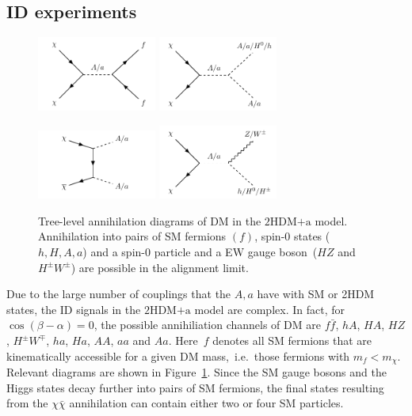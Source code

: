 \documentclass[a4paper, 11pt,notoc]{article}
\newcommand{\hdma}{\ensuremath{\textrm{2HDM+a}}\xspace}
\begin{document}
\subsection{ID experiments}

\begin{figure}[t!]
\centering
\includegraphics[width=0.35\textwidth]{graph_2hdm_relic_s_fermions.pdf} \qquad 
\includegraphics[width=0.35\textwidth]{graph_2hdm_relic_s_bosons.pdf} 

\vspace{5mm}

\includegraphics[width=0.35\textwidth]{graph_2hdm_relic_ss_bosons.pdf} \qquad 
\includegraphics[width=0.35\textwidth]{graph_2hdm_relic_s_vbosons.pdf}
\vspace{4mm}
\caption{Tree-level annihilation diagrams of DM in the \hdma model. Annihilation into pairs of SM fermions $(f)$, spin-0 states ($h, H,A,a$) and a spin-0 particle and a EW gauge boson~($HZ$ and $H^\pm W^\pm$) are possible in the alignment limit.}
\label{fig:feyn_annihilation}
\end{figure}

Due to the large number of couplings that the $A, a$ have with SM or 2HDM states, the ID signals in the \hdma model are  complex. In fact, for~$\cos (\beta - \alpha) = 0$, the possible annihiliation channels of DM are $ f \bar f$, $hA$, $HA$, $HZ$,  $H^\pm W^\mp$, $ha$, $Ha$, $AA$, $aa$ and $Aa$.  Here~$f$ denotes all SM fermions that are kinematically accessible for a given DM mass,~i.e.~those fermions with $m_f < m_\chi$. Relevant diagrams are shown in Figure~\ref{fig:feyn_annihilation}. Since the SM gauge bosons and the Higgs states decay further into pairs of SM fermions, the final states resulting from the $\chi \bar \chi$ annihilation can contain either two or four SM particles. 
\end{document}

